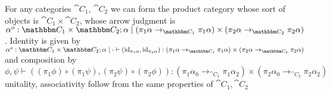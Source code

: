 \documentclass{article}
\begin{document}
\begin{definition}
  For any categories $\cat C_1$, $\cat C_2$ we can form the product
  category whose sort of objects is $\cat C_1 \times \cat C_2$, whose
  arrow judgment is $\alpha^o : \cat C_1 \times \cat C_2;\alpha \pipe
  (\pi_1 \alpha \to_{\cat C_1} \pi_1 \alpha) \times (\pi_2 \alpha
  \to_{\cat C_2} \pi_2 \alpha)$. Identity is given by $\alpha^o : \cat
  C_1 \times \cat C_2;\alpha\pipe\cdot \vdash (\id_{\pi_1 \alpha},
  \id_{\pi_2 \alpha}) : (\pi_1 \alpha \to_{\cat C_1} \pi_1 \alpha)
  \times (\pi_2 \alpha \to_{\cat C_2} \pi_2 \alpha)$ and composition
  by
  \[
  \phi %
  ,
  \psi %
  \vdash ((\pi_1 \phi) \circ (\pi_1 \psi), (\pi_2 \psi) \circ (\pi_2 \phi)) :
  (\pi_1 \alpha_0 \to_{\cat C_1} \pi_1 \alpha_2) \times (\pi_2 \alpha_0 \to_{\cat C_2} \pi_2 \alpha_2)  
  \]
  unitality, associativity follow from the same properties of $\cat C_1,\cat C_2$
\end{definition}
\end{document}
